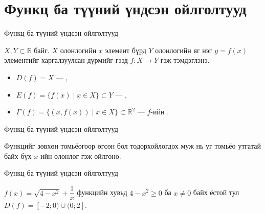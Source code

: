 

\providecommand{\R}{\mathbb{R}}
\providecommand{\N}{\mathbb{N}}
\providecommand{\tg}{\operatorname{tg}}
\providecommand{\ctg}{\operatorname{ctg}}
\providecommand{\arctg}{\operatorname{arctg}}
\providecommand{\arcctg}{\operatorname{arcctg}}
\section{Функц ба түүний үндсэн ойлголтууд}
\begin{frame}[allowframebreaks]{Функц ба түүний үндсэн ойлголтууд}
\begin{definition}[Функц]
$X,Y\subset\R$ байг. $X$ олонлогийн $x$ элемент бүрд $Y$ олонлогийн яг нэг
$y=f(x)$ элементийг харгалзуулсан дүрмийг  гээд $f:X\to Y$ гэж тэмдэглэнэ.
\begin{itemize}
  \item $D(f)=X$ — ,
  \item $E(f)=\{f(x)\mid x\in X\}\subset Y$ — ,
  \item $\Gamma(f)=\{(x,f(x))\mid x\in X\}\subset\R^2$ — $f$-ийн .
\end{itemize}
\end{definition}
\end{frame}

\begin{frame}[allowframebreaks]{Функц ба түүний үндсэн ойлголтууд}
\begin{remark}
Функцийг зөвхөн томьёогоор өгсөн бол тодорхойлогдох муж нь уг томьёо утгатай байх
бүх $x$-ийн олонлог гэж ойлгоно.
\end{remark}
\end{frame}

\begin{frame}[allowframebreaks]{Функц ба түүний үндсэн ойлголтууд}
\begin{example}
$f(x)=\sqrt{4-x^2}+\dfrac{1}{x}$ функцийн хувьд $4-x^2\ge 0$ ба $x\neq0$ байх ёстой тул
$D(f)=[-2;0)\cup(0;2]$.
\end{example}
\end{frame}

